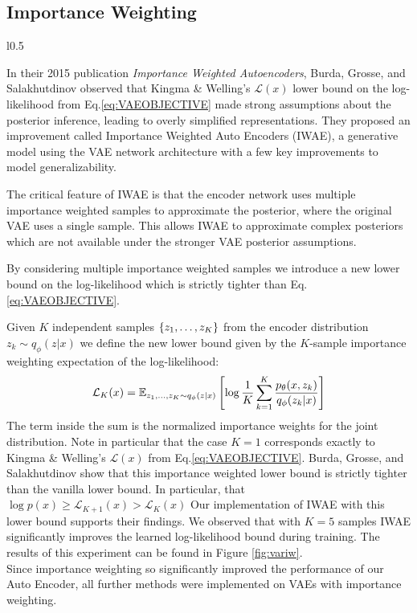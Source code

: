 \documentclass{article} %
\renewcommand{\L}{\mathcal{L}}
\begin{document}
\subsection{Importance Weighting}
%
  \begin{wrapfigure}{l}{0.5\textwidth}
    \captionsetup{justification=centering}
    \resizebox{\linewidth}{!}{}
    \caption{Variational v.s. Importance Weighted (IW)}
    \label{fig:variw}
\end{wrapfigure}
In their 2015 publication \textit{Importance Weighted Autoencoders}, Burda, Grosse, and Salakhutdinov observed that Kingma \& Welling's $\L(x)$ lower bound on the log-likelihood from Eq.\ref{eq:VAEOBJECTIVE} made strong assumptions about the posterior inference, leading to overly simplified representations. They proposed an improvement called Importance Weighted Auto Encoders (IWAE), a generative model using the VAE network architecture with a few key improvements to model generalizability.
\par The critical feature of IWAE is that the encoder network uses multiple importance weighted samples to approximate the posterior, where the original VAE uses a single sample. This allows IWAE to approximate complex posteriors which are not available under the stronger VAE posterior assumptions.
\par By considering multiple importance weighted samples we introduce a new lower bound on the log-likelihood which is strictly tighter than Eq.\ref{eq:VAEOBJECTIVE}.
\par Given $K$ independent samples $\{z_1,\mathellipsis,z_K\}$ from the encoder distribution $z_k\sim q_\phi(z|x)$ we define the new lower bound given by the $K$-sample importance weighting expectation of the log-likelihood:
\begin{equation}
   \L_K(x) = \mathbb{E}_{z_1,\mathellipsis,z_K \sim q_\phi(z|x)}\left[\log\frac{1}{K}\sum_{k=1}^{K}\frac{p_\theta(x,z_k)}{q_\phi(z_k|x)}\right]
\end{equation}
The term inside the sum is the normalized importance weights for the joint distribution. Note in particular that the case $K=1$ corresponds exactly to Kingma \& Welling's $\L(x)$ from Eq.\ref{eq:VAEOBJECTIVE}. Burda, Grosse, and Salakhutdinov show that this importance weighted lower bound is strictly tighter than the vanilla lower bound. In particular, that $\log p(x) \geq \L_{K+1}(x)>\L_K(x)$ Our implementation of IWAE with this lower bound supports their findings. We observed that with $K=5$ samples IWAE significantly improves the learned log-likelihood bound during training. The results of this experiment can be found in Figure \ref{fig:variw}. \\
Since importance weighting so significantly improved the performance of our Auto Encoder, all further methods were implemented on VAEs with importance weighting.
\end{document}
